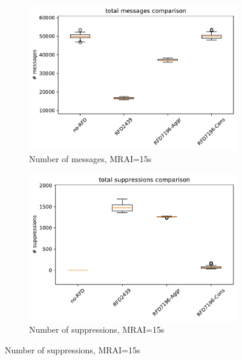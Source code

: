 \begin{figure}[H]
     \hfill
     \begin{subfigure}[b]{0.325\textwidth}
         \centering
         \includegraphics[width=\textwidth]{images/RFD/miceVSelephants/MultiMRAI/15/mice/cisco_1000MRAI15_rfd_comparison_messages_boxplot.pdf}
         \caption{\scriptsize Number of messages, MRAI=15s}
         \label{fig:1000_RFD_MRAI15_messages_mice}
     \end{subfigure}
     \hfill
     \begin{subfigure}[b]{0.325\textwidth}
         \centering
         \includegraphics[width=\textwidth]{images/RFD/miceVSelephants/MultiMRAI/15/mice/cisco_1000MRAI15_rfd_comparison_suppressions_boxplot.pdf}
         \caption{\scriptsize Number of suppressions, MRAI=15s}
         \label{fig:1000_RFD_MRAI15_suppressions_mice}
     \end{subfigure}

\end{figure}
